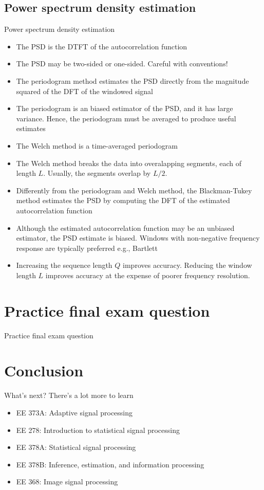 \documentclass[10pt, aspectratio=169]{beamer}
\begin{document}
\subsection{Power spectrum density estimation}
\begin{frame}{Power spectrum density estimation}
\begin{itemize}
	\item The PSD is the DTFT of the autocorrelation function
	\item The PSD may be two-sided or one-sided. Careful with conventions!
	\item The periodogram method estimates the PSD directly from the magnitude squared of the DFT of the windowed signal
	\item The periodogram is an biased estimator of the PSD, and it has large variance. Hence, the periodogram must be averaged to produce useful estimates
	\item The Welch method is a time-averaged periodogram
	\item The Welch method breaks the data into overalapping segments, each of length $L$. Usually, the segments overlap by $L/2$.
	\item Differently from the periodogram and Welch method, the Blackman-Tukey method estimates the PSD by computing the DFT of the estimated autocorrelation function
	\item Although the estimated autocorrelation function may be an unbiased estimator, the PSD estimate is biased. Windows with non-negative frequency response are typically preferred e.g., Bartlett
	\item Increasing the sequence length $Q$ improves accuracy. Reducing the window length $L$ improves accuracy at the expense of poorer frequency resolution.
\end{itemize}
\end{frame}

\section{Practice final exam question}
\begin{frame}{Practice final exam question}
	
\end{frame}
%
\section{Conclusion}
\begin{frame}{What's next?}
There's a lot more to learn
\begin{itemize}
\item EE 373A: Adaptive signal processing
\item EE 278: Introduction to statistical signal processing
\item EE 378A: Statistical signal processing
\item EE 378B: Inference, estimation, and information processing
\item EE 368: Image signal processing	
\end{itemize}
\end{frame}
\end{document}
